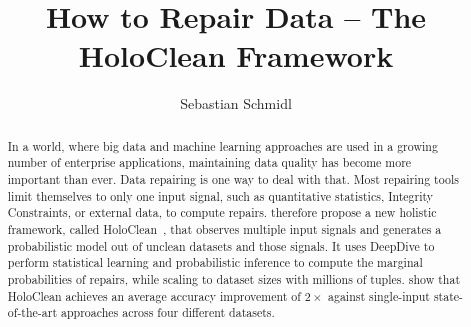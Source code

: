 \documentclass[format=sigconf]{acmart}
\newcommand{\holoclean}{HoloClean}
\newcommand{\deepdive}{DeepDive}
\begin{document}
\title[How to Repair Data -- The HoloClean Framework]{How to Repair Data -- The HoloClean Framework}

\author{Sebastian Schmidl}



\begin{abstract}
In a world, where big data and machine learning approaches are used in a growing number of enterprise applications, maintaining data quality has become more important than ever.
Data repairing is one way to deal with that.
Most repairing tools limit themselves to only one input signal, such as quantitative statistics, Integrity Constraints, or external data, to compute repairs.
\citeauthor{holoclean} therefore propose a new holistic framework, called \holoclean~\cite{holoclean}, that observes multiple input signals and generates a probabilistic model out of unclean datasets and those signals.
It uses \deepdive{} to perform statistical learning and probabilistic inference to compute the marginal probabilities of repairs, while scaling to dataset sizes with millions of tuples.
\citeauthor{holoclean} show that \holoclean{} achieves an average accuracy improvement of $2 \times$ against single-input state-of-the-art approaches across four different datasets.
\end{abstract}






\maketitle
\thispagestyle{plain}

\renewcommand{\shortauthors}{S. Schmidl}






\end{document}
